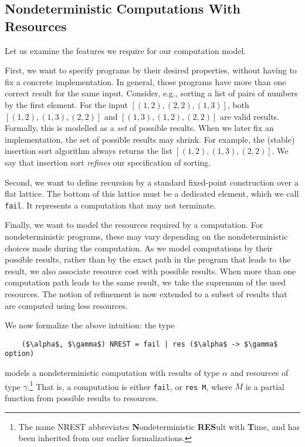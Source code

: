 \documentclass[acmsmall]{acmart}
\newcommand{\is}{\lstinline[language=isabelle]}
\begin{document}
\subsection{Nondeterministic Computations With Resources}\label{sec:nrest}
Let us examine the features we require for our computation model.

First, we want to specify programs by their desired properties, without having to fix a concrete implementation.
In general, those programs have more than one correct result for the same input. Consider, e.g., sorting a list of pairs of numbers by the first element. For the input $[(1,2),(2,2),(1,3)]$, both $[(1,2),(1,3),(2,2)]$ and $[(1,3),(1,2),(2,2)]$ are valid results. Formally, this is modelled as a \emph{set} of possible results. 
When we later fix an implementation, the set of possible results may shrink. For example, the (stable) insertion sort algorithm always returns the list $[(1,2),(1,3),(2,2)]$. We say that insertion sort \emph{refines} our specification of sorting.


Second, we want to define recursion by a standard fixed-point construction over a flat lattice.
The bottom of this lattice must be a dedicated element, which we call \is{fail}.
It represents a computation that may not terminate.

Finally, we want to model the resources required by a computation. For nondeterministic programs, these may vary depending on the nondeterministic choices made during the computation. As we model computations by their possible results, rather than by the exact path in the program that leads to the result, we also associate resource cost with possible results.
When more than one computation path leads to the same result, we take the supremum of the used resources. The notion of refinement is now extended to a subset of results that are computed using less resources.

We now formalize the above intuition: the type 
\begin{lstlisting}
    ($\alpha$, $\gamma$) NREST = fail | res ($\alpha$ -> $\gamma$ option)
\end{lstlisting}
models a nondeterministic computation with results of type $\alpha$ and resources of type $\gamma$.\footnote{The name NREST abbreviates {\bf N}ondeterministic {\bf RES}ult with {\bf T}ime, and has been inherited from our earlier formalizations.} That is, a computation is either \is{fail}, or \is{res M}, where $M$ is a partial function from possible results to resources.
\end{document}
